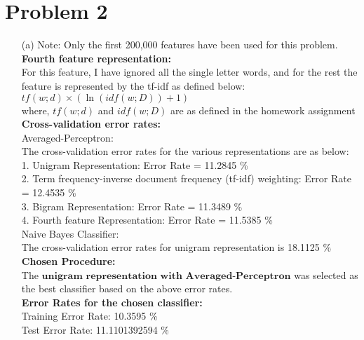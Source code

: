 \documentclass[fleqn]{article}
\begin{document}
\section{Problem 2}{}
\begin{itemize}
	\item[(a)]
		Note: Only the first 200,000 features have been used for this problem.\\
		\textbf{Fourth feature representation:} \\
		For this feature, I have ignored all the single letter words, and for the rest the feature is represented by the tf-idf as defined below: \\
			$tf(w; d) \times (\ln(idf(w;D)) + 1)$ \\
		where, $tf(w;d)$ and $idf(w;D)$ are as defined in the homework assignment \\

		\textbf{Cross-validation error rates:}\\
		Averaged-Perceptron:\\
		The cross-validation error rates for the various representations are as below:\\
		1. Unigram Representation: Error Rate = 11.2845 \% \\
		2. Term frequency-inverse document frequency (tf-idf) weighting: Error Rate = 12.4535 \% \\
		3. Bigram Representation: Error Rate = 11.3489 \% \\
		4. Fourth feature Representation: Error Rate = 11.5385 \% \\
		
		Naive Bayes Classifier:\\
		The cross-validation error rates for unigram representation is 18.1125 \% \\
		
		\textbf{Chosen Procedure:}\\
		The $\textbf{unigram representation with Averaged-Perceptron}$ was selected as the best classifier based on the above error rates.\\

		\textbf{Error Rates for the chosen classifier:}\\
		Training Error Rate: 10.3595 \%\\
		Test Error Rate: 11.1101392594 \%\\


\end{itemize}
\end{document}
